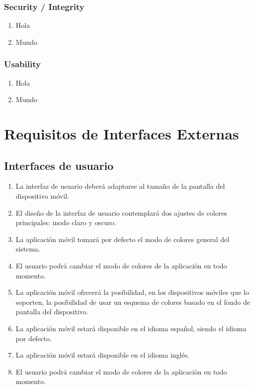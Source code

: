         \subsubsection{Security / Integrity}
            \begin{enumerate}[resume, label=\textbf{\texttt{RNF-\arabic*}}]
                \item Hola
                \item Mundo
            \end{enumerate}
        \subsubsection{Usability}
            \begin{enumerate}[resume, label=\textbf{\texttt{RNF-\arabic*}}]
                \item Hola
                \item Mundo
            \end{enumerate}

\section{Requisitos de Interfaces Externas}

    \subsection{Interfaces de usuario}
        \begin{enumerate}[label=\textbf{\texttt{RIU-\arabic*}}]
            \item La interfaz de usuario deberá adaptarse al tamaño de la pantalla del dispositivo móvil.
            \item El diseño de la interfaz de usuario contemplará dos ajustes de colores principales: modo claro y oscuro.
            \item La aplicación móvil tomará por defecto el modo de colores general del sistema.
            \item El usuario podrá cambiar el modo de colores de la aplicación en todo momento. 
            \item La aplicación móvil ofrecerá la posibilidad, en los dispositivos móviles que lo soporten, la posibilidad de usar un esquema de colores basado en el fondo de pantalla del dispositivo.
            \item La aplicación móvil estará disponible en el idioma español, siendo el idioma por defecto.
            \item La aplicación móvil estará disponible en el idioma inglés.
            \item El usuario podrá cambiar el modo de colores de la aplicación en todo momento.
        \end{enumerate}

